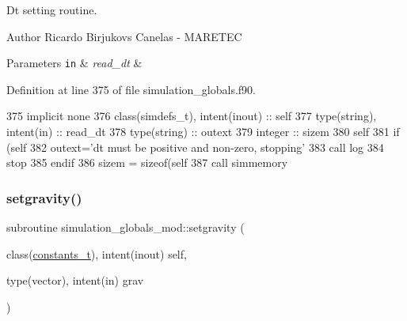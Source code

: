 Dt setting routine. 

\begin{DoxyAuthor}{Author}
Ricardo Birjukovs Canelas -\/ M\+A\+R\+E\+T\+EC
\end{DoxyAuthor}

\begin{DoxyParams}[1]{Parameters}
\mbox{\tt in}  & {\em read\+\_\+dt} & \\
\hline
\end{DoxyParams}


Definition at line 375 of file simulation\+\_\+globals.\+f90.


\begin{DoxyCode}
375     \textcolor{keywordtype}{implicit none}
376     \textcolor{keywordtype}{class}(simdefs\_t), \textcolor{keywordtype}{intent(inout)} :: self
377     \textcolor{keywordtype}{type}(string), \textcolor{keywordtype}{intent(in)} :: read\_dt
378     \textcolor{keywordtype}{type}(string) :: outext
379     \textcolor{keywordtype}{integer} :: sizem
380     self%
381     \textcolor{keywordflow}{if} (self%
382         outext=\textcolor{stringliteral}{'dt must be positive and non-zero, stopping'}
383         \textcolor{keyword}{call }log%
384         stop
385 \textcolor{keywordflow}{    endif}
386     sizem = sizeof(self%
387     \textcolor{keyword}{call }simmemory%
\end{DoxyCode}
\mbox{\label{namespacesimulation__globals__mod_a9e92dfed4ef7388208adce768f064554}} 
\subsubsection{\texorpdfstring{setgravity()}{setgravity()}}
{\footnotesize\ttfamily subroutine simulation\+\_\+globals\+\_\+mod\+::setgravity (\begin{DoxyParamCaption}\item[{class(\mbox{\hyperlink{structsimulation__globals__mod_1_1constants__t}{constants\+\_\+t}}), intent(inout)}]{self,  }\item[{type(vector), intent(in)}]{grav }\end{DoxyParamCaption})\hspace{0.3cm}{\ttfamily [private]}}



